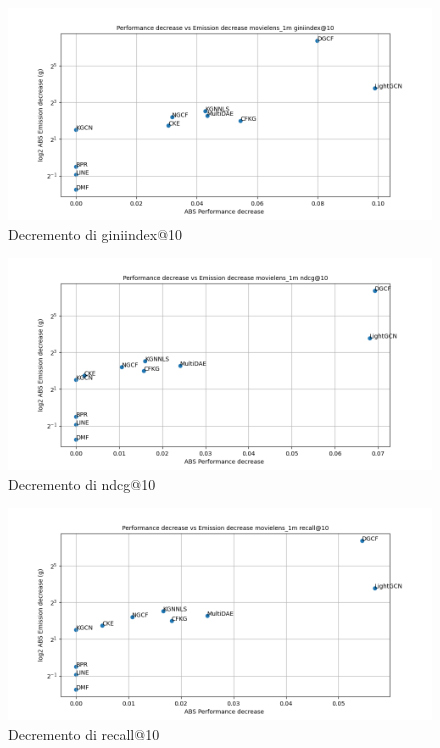 \begin{figure}[H]
    \centering
     \includegraphics[width=\textwidth]{images/decrement_giniindex@10_movielens_1m_40_7.png}
    \caption{Decremento di giniindex@10}
\end{figure}

\begin{figure}[H]
    \centering
     \includegraphics[width=\textwidth]{images/decrement_ndcg@10_movielens_1m_40_7.png}
    \caption{Decremento di ndcg@10}
\end{figure}

\begin{figure}[H]
    \centering
     \includegraphics[width=\textwidth]{images/decrement_recall@10_movielens_1m_40_7.png}
    \caption{Decremento di recall@10}
\end{figure}

